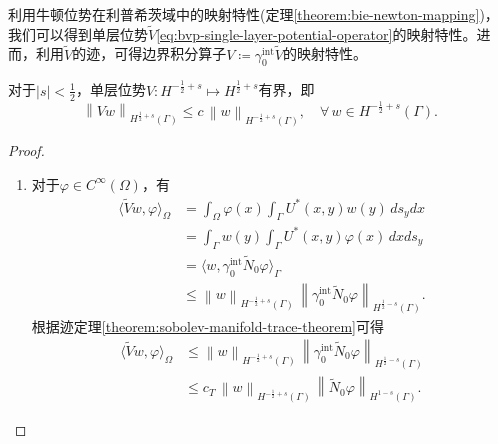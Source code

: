 利用牛顿位势在利普希茨域中的映射特性(定理\ref{theorem:bie-newton-mapping})，我们可以得到单层位势$\widetilde{V}$\eqref{eq:bvp-single-layer-potential-operator}的映射特性。进而，利用$\widetilde{V}$的迹，可得边界积分算子$V \coloneqq \gamma_{0}^{\text{int}} \widetilde{V}$的映射特性。
\begin{theorem}[单层位势算子的映射特性]
  \label{theorem:bie-single-layer-mapping}
  对于$\left| s \right| < \frac{1}{2}$，单层位势$V: H^{-\frac{1}{2} + s} \mapsto H^{\frac{1}{2} + s}$有界，即
  \begin{equation*}
    \left\| V w \right\|_{H^{\frac{1}{2}+ s}(\Gamma)}
    \le c \, \left\| w \right\|_{H^{-\frac{1}{2} + s}(\Gamma)}, \quad \forall \, w \in H^{-\frac{1}{2} + s}(\Gamma).
  \end{equation*}
\end{theorem}
\begin{proof}
  \begin{enumerate}
    \item 对于$\varphi \in C^{\infty}(\Omega)$，有
    \begin{equation*}
      \begin{split}
        \langle \widetilde{V} w, \varphi \rangle_{\Omega}
        & = \int_{\Omega} \varphi(x)
        \int_{\Gamma} U^{*}(x,y) w(y) \, d s_{y}
        d x \\
        & = \int_{\Gamma} w(y)
        \int_{\Gamma} U^{*}(x,y) \varphi(x) \, dx
        d s_{y}\\
        & = \langle w, \gamma_{0}^{\text{int}} \widetilde{N}_{0} \varphi \rangle_{\Gamma} \\
        & \le
        \left\| w \right\|_{H^{-\frac{1}{2} + s}(\Gamma)}
        \, \left\| \gamma_{0}^{\text{int}} \widetilde{N}_{0} \varphi \right\|_{H^{\frac{1}{2} - s}(\Gamma)}.
      \end{split}
    \end{equation*}
    根据迹定理\ref{theorem:sobolev-manifold-trace-theorem}可得
    \begin{equation*}
      \begin{split}
        \langle \widetilde{V} w, \varphi \rangle_{\Omega}
        & \le
        \left\| w \right\|_{H^{-\frac{1}{2} + s}(\Gamma)}
        \, \left\| \gamma_{0}^{\text{int}} \widetilde{N}_{0} \varphi \right\|_{H^{\frac{1}{2} - s}(\Gamma)} \\
        & \le
        c_{T} \, \left\| w \right\|_{H^{-\frac{1}{2} + s}(\Gamma)} \,
         \left\| \widetilde{N}_{0} \varphi \right\|_{H^{1 - s}(\Gamma)}.
      \end{split}
    \end{equation*}


\end{enumerate}
\end{proof}
